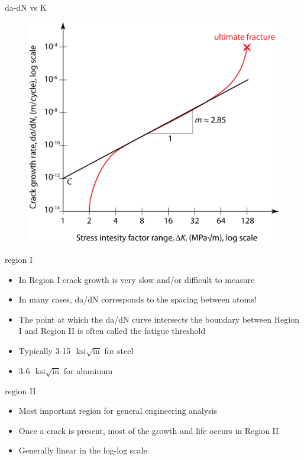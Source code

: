 \documentclass[10pt]{beamer}
\begin{document}
\begin{frame}{da-dN vs K}	
	\begin{figure}
	\centering
	\includegraphics[width=0.7\linewidth]{../Figures/da-dn}
	\label{fig:da-dn}
	\end{figure}
\end{frame}

\begin{frame}{region I}
	\begin{itemize}[<+->]
		\item In Region I crack growth is very slow and/or difficult to measure
		\item In many cases, da/dN corresponds to the spacing between atoms!
		\item The point at which the da/dN curve intersects the boundary between Region I and Region II is often called the fatigue threshold
		\item Typically 3-15 $\text{ ksi} \sqrt{\text{in}}$ for steel
		\item 3-6 $\text{ ksi} \sqrt{\text{in}}$ for aluminum
	\end{itemize}
\end{frame}

\begin{frame}{region II}
	\begin{itemize}[<+->]
		\item Most important region for general engineering analysis
		\item Once a crack is present, most of the growth and life occurs in Region II
		\item Generally linear in the log-log scale
	\end{itemize}
\end{frame}
\end{document}
